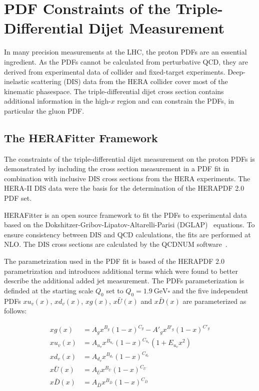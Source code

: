 
\chapter{PDF Constraints of the Triple-Differential Dijet Measurement}

In many precision measurements at the LHC, the proton PDFs are an essential
ingredient. As the PDFs cannot be calculated from perturbative QCD, they are
derived from experimental data of collider and fixed-target experiments.
Deep-inelastic scattering (DIS) data from the HERA collider cover most of the
kinematic phasespace. The triple-differential dijet cross section contains
additional information in the high-$x$ region and can constrain the PDFs, in
particular the gluon PDF. 

\section{The HERAFitter Framework}
\label{section:herafittersetup}

The constraints of the triple-differential dijet measurement on the proton PDFs
is demonstrated by including the cross section measurement in a PDF fit in
combination with inclusive DIS cross sections from the HERA experiments. The
HERA-II DIS data were the basis for the determination of the HERAPDF 2.0 PDF
set.

HERAFitter is an open source framework to fit the PDFs to experimental data
based on the Dokshitzer-Gribov-Lipatov-Altarelli-Parisi
(DGLAP)~\cite{Gribov:1972ri,Altarelli:1977zs,Dokshitzer:1977sg} equations. To
ensure consistency between DIS and QCD calculations, the fits are performed at
NLO. The DIS cross sections are calculated by the QCDNUM
software~\cite{Botje:2010ay}.

The parametrization used in the PDF fit is based of the HERAPDF 2.0
parametrization and introduces additional terms which were found to better
describe the additional added jet measurement. The PDFs parameterization is
definded at the
starting scale $Q_0$ set to $Q_0 = \SI{1.9}{\GeV \square}$ and the five
independent PDFs $xu_v(x)$, $xd_v(x)$, $xg(x)$, $x\bar{U}(x)$ and $x\bar{D}(x)$
are parameterized as follows:

\begin{align}
  xg(x) &= A_g x^{B_g} (1-x)^{C_g} - A'_g x^{B'_g} (1-x)^{C'_g} \\
  xu_v(x) &= A_{u_{v}} x^{B_{u_{v}}} (1-x)^{C_{u_{v}}} (1 + E_{u_{v}}x^2)\\
  xd_v(x) &= A_{d_v} x^{B_{d_v}} (1-x)^{C_{d_{v}}}\\
  x\bar U(x) &= A_{\bar U} x^{B_{\bar U}} (1-x)^{C_{\bar U}}\\
  x\bar D(x) &= A_{\bar D} x^{B_{\bar D}} (1-x)^{C_{\bar D}}
\end{align}


